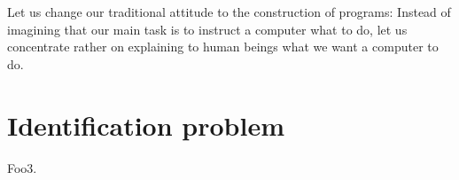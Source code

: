 
\begin{savequote}[99mm]
Let us change our traditional attitude to the construction of programs: Instead of imagining that our main task is to instruct a computer what to do, let us concentrate rather on explaining to human beings what we want a computer to do.
\end{savequote}

\chapter{Identification problem}\label{chap:id-problem}

Foo3.